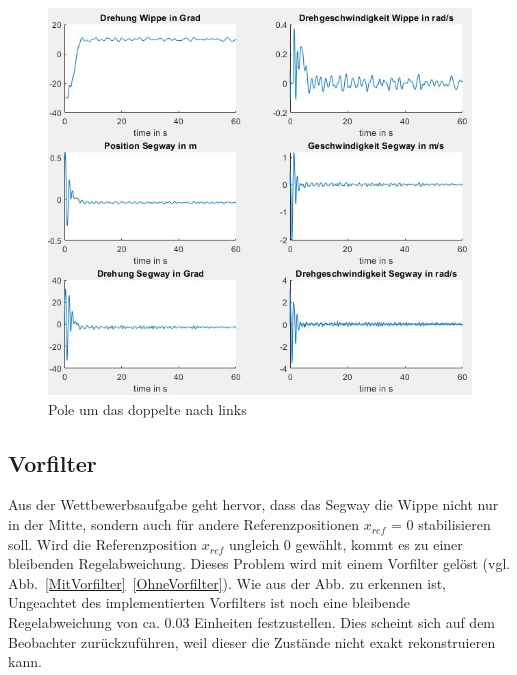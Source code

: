 \documentclass[pdf]{ifacconf}
\begin{document}
\begin{figure}[h]	
\centerline{\includegraphics[width=\linewidth]{Bilder/Regler1mal2.jpg}}
	\label{Rauschen2}
	\caption{Pole um das doppelte nach links}
\end{figure}




	\subsection{Vorfilter}
	Aus der Wettbewerbsaufgabe geht hervor, dass das Segway die Wippe nicht nur in der Mitte, sondern auch für andere Referenzpositionen $x^{}_{ref}$ = 0 stabilisieren soll. Wird die Referenzposition $x^{}_{ref}$ ungleich 0 gewählt, kommt es zu einer bleibenden Regelabweichung. Dieses Problem wird mit einem Vorfilter gelöst (vgl. Abb.~\ref{MitVorfilter}~\ref{OhneVorfilter}). Wie aus der Abb. zu erkennen ist, 
	Ungeachtet des implementierten Vorfilters ist noch eine bleibende Regelabweichung von ca. 0.03 Einheiten festzustellen. Dies scheint sich auf dem Beobachter zurückzuführen, weil dieser die Zustände nicht exakt rekonstruieren kann.  
\end{document}
